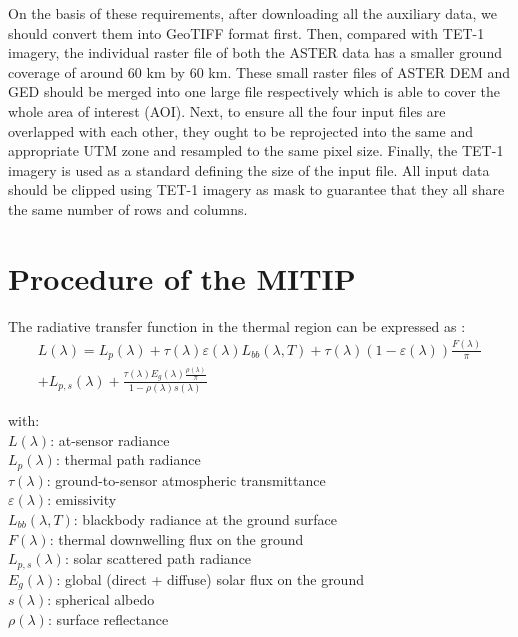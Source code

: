 \noindent On the basis of these requirements, after downloading all the auxiliary data, we should convert them into GeoTIFF format first. Then, compared with TET-1 imagery, the individual raster file of both the ASTER data has a smaller ground coverage of around 60 km by 60 km. These small raster files of ASTER DEM and GED should be merged into one large file respectively which is able to cover the whole area of interest (AOI). Next, to ensure all the four input files are overlapped with each other, they ought to be reprojected into the same and appropriate UTM zone and resampled to the same pixel size. Finally, the TET-1 imagery is used as a standard defining the size of the input file. All input data should be clipped using TET-1 imagery as mask to guarantee that they all share the same number of rows and columns.\\ 


\section{Procedure of the MITIP}

The radiative transfer function in the thermal region can be expressed as \parencite{Reference304, Reference305}:
\begin{equation}
\begin{aligned}
\label{eq301}
L(\lambda) = L_p(\lambda) + \tau (\lambda) \varepsilon (\lambda) L_{bb}(\lambda, T) + \tau (\lambda) (1 - \varepsilon (\lambda)) \frac{F(\lambda)}{\pi}\\
+L_{p,s}(\lambda) + \frac{\tau (\lambda) E_g(\lambda) \frac{\rho (\lambda)}{\pi}}{1 - \rho (\lambda) s(\lambda)}
\end{aligned}
\end{equation}

\noindent with:\\
\indent $L(\lambda)$: at-sensor radiance\\
\indent $L_p(\lambda)$: thermal path radiance\\
\indent $\tau (\lambda)$: ground-to-sensor atmospheric transmittance\\
\indent $\varepsilon (\lambda)$: emissivity\\
\indent $L_{bb}(\lambda, T)$: blackbody radiance at the ground surface\\
\indent $F(\lambda)$: thermal downwelling flux on the ground\\
\indent $L_{p, s}(\lambda)$: solar scattered path radiance\\
\indent $E_g(\lambda)$: global (direct + diffuse) solar flux on the ground\\
\indent $s(\lambda)$: spherical albedo\\
\indent $\rho (\lambda)$: surface reflectance\\


